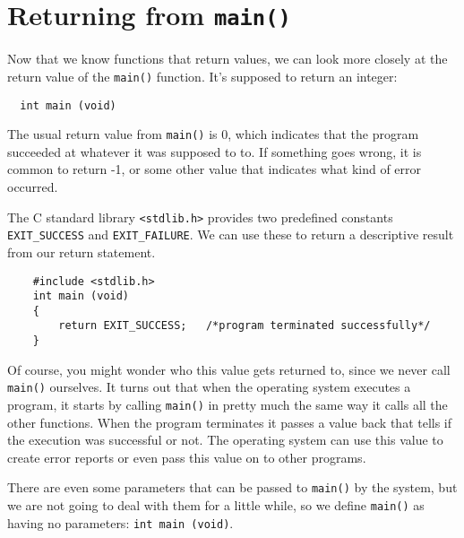 \section {Returning from {\tt main()}}

Now that we know functions that return values, we can look more closely at the 
return value of the {\tt main()} function.
It's supposed to return an integer:

\begin{verbatim}
  int main (void)
\end{verbatim}

The usual return value from {\tt main()} is 0, which indicates that
the program succeeded at whatever it was supposed to to.  If something
goes wrong, it is common to return -1, or some other value that
indicates what kind of error occurred.


The C standard library \texttt{<stdlib.h>} provides two predefined constants {\tt EXIT\_SUCCESS} and {\tt EXIT\_FAILURE}.
We can use these to return a descriptive result from our return statement. 


\begin{verbatim}
    #include <stdlib.h>
    int main (void)
    {
        return EXIT_SUCCESS;   /*program terminated successfully*/
    }  
\end{verbatim}
%


Of course, you might wonder who this value gets returned to, since
we never call {\tt main()} ourselves.  It turns out that when the
operating system executes a program, it starts by calling {\tt main()}
in pretty much the same way it calls all the other functions.
When the program terminates it passes a value back 
that tells if the execution was successful or not. The operating system
can use this value to create error reports or even pass this value on 
to other programs.

There are even some parameters that can be passed to {\tt main()}
by the system, but we are not going to deal with them for a little
while, so we define  {\tt main()} as having no parameters:  {\tt int main (void)}. 




